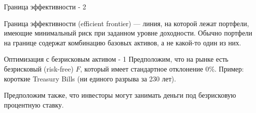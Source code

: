 \documentclass{beamer}
\begin{document}
\begin{frame}{Граница эффективности - 2}
\centering
{}
\justify
Граница эффективности (efficient frontier) --- линия, на которой лежат портфели, имеющие минимальный риск при заданном уровне доходности. Обычно портфели на границе содержат комбинацию базовых активов, а не какой-то один из них.
\end{frame}



\begin{frame}{Оптимизация с безрисковым активом - 1}
\justify
Предположим, что на рынке есть безрисковый (risk-free) $F$, который имеет стандартное отклонение $0\%$. Пример: короткие Treasury Bills (ни единого разрыва за 230 лет).

\justify
Предположим также, что инвесторы могут занимать деньги под безрисковую процентную ставку.
\end{frame}


\renewcommand{\drawAssetNode}[4]{
    \node[circle,fill,inner sep=2pt] at (axis cs: #1, #2) {};
    \node[anchor=#4] at (axis cs: #1, #2) {\small #3};
}

\renewcommand{\drawPortfolioNode}[8]{\node[anchor=#8] at (axis cs: #1, #2) {
		\scriptsize \begin{tabular}{|l|r|}
		\hline
		\multicolumn{2}{|c|}{#3} \\ \hline
		Акц. & #4\% \\
		Обл. & #5\% \\
		Нед. & #6\%  \\
		Зол. & #7\% \\
		\hline
		\end{tabular}
	};
	\node[circle, fill, inner sep=2pt, color=Set1-B] at (axis cs:#1, #2) {};
}
\end{document}
